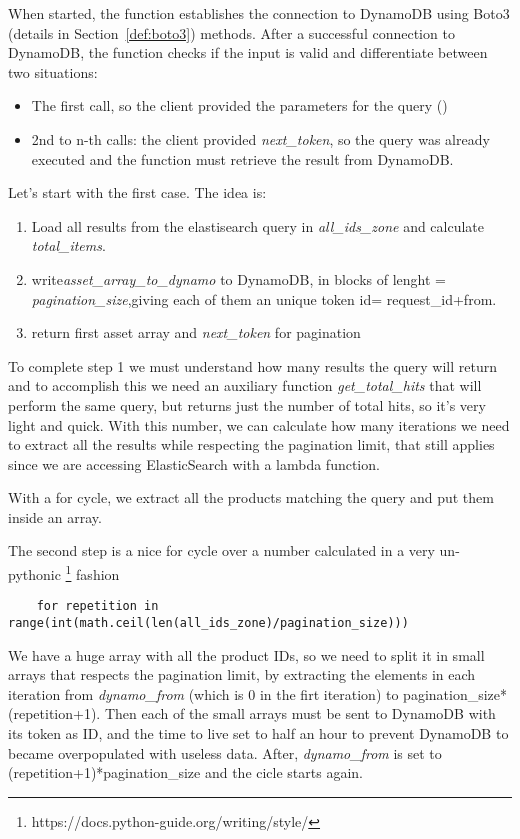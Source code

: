 When started, the function establishes the connection to DynamoDB using Boto3 (details in Section~\ref{def:boto3}) methods.
After a successful connection to DynamoDB, the function checks if the input is valid and differentiate between two
situations: 
\begin{itemize}
    \item The first call, so the client provided the parameters for the query ()
    \item  2nd to n-th calls: the client provided  \textit{next\_token}, so the query was already executed and the function must retrieve the result from DynamoDB.
\end{itemize}

Let's start with the first case. 
The idea is:
\begin{enumerate}
    \item Load all results from the elastisearch query in \textit{all\_ids\_zone} and calculate \textit{total\_items}. 
    \item write\textit{asset\_array\_to\_dynamo} to DynamoDB, in blocks of lenght = \textit{pagination\_size},giving each of them an unique token id= request\_id+from.
    \item  return first asset array and \textit{next\_token} for pagination 
\end{enumerate}

To complete step 1 we must understand how many results the query will return and to accomplish this
we need an auxiliary function \textit{get\_total\_hits} that will perform the same query, but returns just 
the number of total hits, so it's very light and quick.
With this number, we can calculate how many iterations we need to extract all the results 
while respecting the pagination limit, that still applies since we are accessing
ElasticSearch with a lambda function.

With a for cycle, we extract all the products matching the query and put them inside an array.

The second step is  a nice for cycle over a number calculated in a very un-pythonic
\footnote{https://docs.python-guide.org/writing/style/} fashion
\begin{lstlisting}
    for repetition in range(int(math.ceil(len(all_ids_zone)/pagination_size))) 
\end{lstlisting}

 We have a huge array with all the product IDs, so we need to split it in small arrays that
respects the pagination limit, by extracting the elements in each iteration
from \textit{dynamo\_from} (which is 0 in the firt iteration) to pagination\_size*(repetition+1).
Then each of the small arrays must be sent to DynamoDB with its token as ID, and 
the time to live set to half an hour to prevent DynamoDB to became overpopulated with useless data.
After, \textit{dynamo\_from} is set to (repetition+1)*pagination\_size and the cicle starts again.

